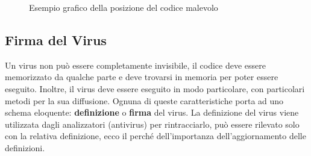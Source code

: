 \begin{figure}[htpb]
\centering
{}
		\caption{Esempio grafico della posizione del codice malevolo \label{fig:virus_posizione_codice}}  
\end{figure}

\subsection{Firma del Virus}
Un virus non può essere completamente invisibile, il codice deve essere memorizzato da qualche parte e deve trovarsi in memoria per poter essere eseguito. Inoltre, il virus deve essere eseguito in modo particolare, con particolari metodi per la sua diffusione.
Ognuna di queste caratteristiche porta ad uno schema eloquente: \textbf{definizione} o \textbf{firma} del virus.
La definizione del virus viene utilizzata dagli analizzatori (antivirus) per rintracciarlo, può essere rilevato solo con la relativa definizione, ecco il perché dell'importanza dell'aggiornamento delle definizioni.
\newline

